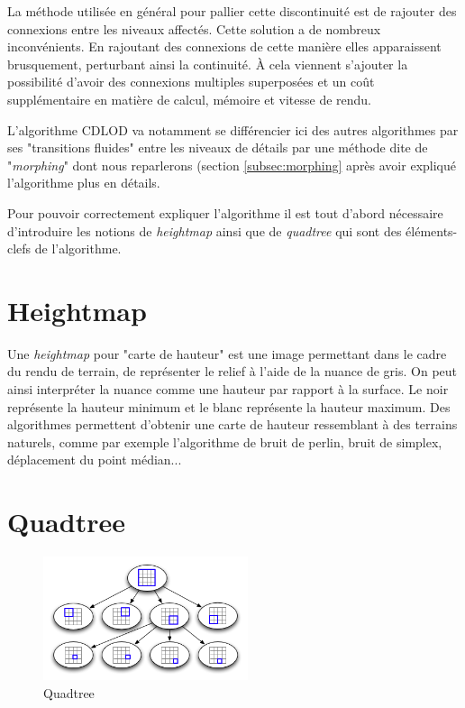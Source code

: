  La méthode utilisée en général pour pallier cette discontinuité est de rajouter des connexions entre les niveaux affectés. 
 Cette solution a de nombreux inconvénients. En rajoutant des connexions de cette manière elles apparaissent brusquement, perturbant ainsi la continuité. À cela viennent s'ajouter la possibilité d'avoir des connexions multiples superposées et un coût supplémentaire en matière de calcul, mémoire et vitesse de rendu.
 
 L'algorithme CDLOD va notamment se différencier ici des autres algorithmes par ses "transitions fluides" entre les niveaux de détails par une méthode dite de "\textit{morphing}" dont nous reparlerons (section \ref{subsec:morphing} après avoir expliqué l'algorithme plus en détails.
 
 Pour pouvoir correctement expliquer l'algorithme il est tout d'abord nécessaire d'introduire les notions de \textit{heightmap} ainsi que de \textit{quadtree} qui sont des éléments-clefs de l'algorithme.
 
  \section{Heightmap}
  \label{sec:heightmap}
  
  Une \emph{heightmap} pour "carte de hauteur" est une image permettant dans le cadre du rendu de terrain, de représenter le relief à l'aide de la nuance de gris. On peut ainsi interpréter la nuance comme une hauteur par rapport à la surface. Le noir représente la hauteur minimum et le blanc représente la hauteur maximum. Des algorithmes permettent d'obtenir une carte de hauteur ressemblant à des terrains naturels, comme par exemple l'algorithme de bruit de perlin, bruit de simplex, déplacement du point médian...
   
  
  
  
  \section{Quadtree}
  \label{sec:quadtree}
  
\begin{figure}
 \includegraphics[width=6cm]{img/quadtree-arbre.png}
   \caption[Quadtree]{Quadtree\protect\footnotemark}
   \label{fig:quadtree-arbre}
 \end{figure}
  
